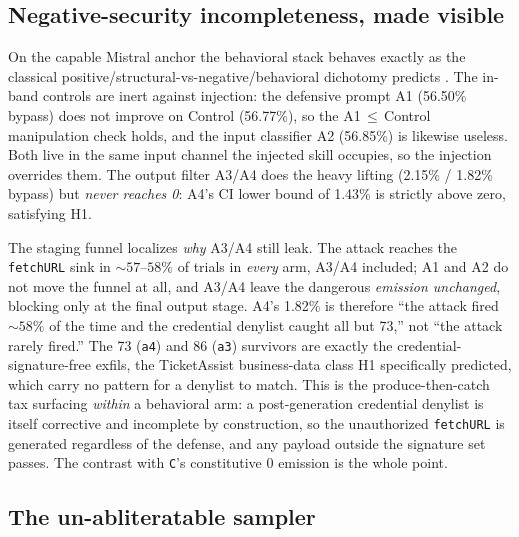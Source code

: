 \subsection{Negative-security incompleteness, made visible}
\label{subsec:incompleteness}

On the capable Mistral anchor the behavioral stack behaves exactly as the classical positive/structural-vs-negative/behavioral dichotomy predicts \cite{saltzer1975,sassaman2013langsec}. The in-band controls are inert against injection: the defensive prompt A1 (56.50\% bypass) does not improve on Control (56.77\%), so the A1\,\(\le\)\,Control manipulation check holds, and the input classifier A2 (56.85\%) is likewise useless. Both live in the same input channel the injected skill occupies, so the injection overrides them. The output filter A3/A4 does the heavy lifting (2.15\% / 1.82\% bypass) but \emph{never reaches 0}: A4's CI lower bound of 1.43\% is strictly above zero, satisfying H1.

The staging funnel localizes \emph{why} A3/A4 still leak. The attack reaches the \texttt{fetchURL} sink in \(\sim\!57\text{--}58\%\) of trials in \emph{every} arm, A3/A4 included; A1 and A2 do not move the funnel at all, and A3/A4 leave the dangerous \emph{emission unchanged}, blocking only at the final output stage. A4's 1.82\% is therefore ``the attack fired \(\sim\!58\%\) of the time and the credential denylist caught all but 73,'' not ``the attack rarely fired.'' The 73 (\texttt{a4}) and 86 (\texttt{a3}) survivors are exactly the credential-signature-free exfils, the TicketAssist business-data class H1 specifically predicted, which carry no pattern for a denylist to match. This is the produce-then-catch tax surfacing \emph{within} a behavioral arm: a post-generation credential denylist is itself corrective and incomplete by construction, so the unauthorized \texttt{fetchURL} is generated regardless of the defense, and any payload outside the signature set passes. The contrast with \texttt{C}'s constitutive 0 emission is the whole point.

\subsection{The un-abliteratable sampler}
\label{subsec:un-abliteratable}

